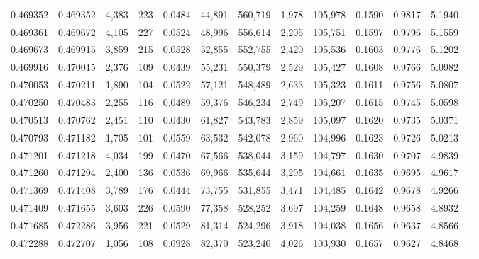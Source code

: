 \begin{tabular}{rrrrrrrrrrrrr}
0.469352 & 0.469352 & 4,383 &   223 &                                     0.0484 &  44,891 & 560,719 &   1,978 & 105,978 & 0.1590 & 0.9817 & 5.1940 \\
0.469361 & 0.469672 & 4,105 &   227 &                                     0.0524 &  48,996 & 556,614 &   2,205 & 105,751 & 0.1597 & 0.9796 & 5.1559 \\
0.469673 & 0.469915 & 3,859 &   215 &                                     0.0528 &  52,855 & 552,755 &   2,420 & 105,536 & 0.1603 & 0.9776 & 5.1202 \\
0.469916 & 0.470015 & 2,376 &   109 &                                     0.0439 &  55,231 & 550,379 &   2,529 & 105,427 & 0.1608 & 0.9766 & 5.0982 \\
0.470053 & 0.470211 & 1,890 &   104 &                                     0.0522 &  57,121 & 548,489 &   2,633 & 105,323 & 0.1611 & 0.9756 & 5.0807 \\
0.470250 & 0.470483 & 2,255 &   116 &                                     0.0489 &  59,376 & 546,234 &   2,749 & 105,207 & 0.1615 & 0.9745 & 5.0598 \\
0.470513 & 0.470762 & 2,451 &   110 &                                     0.0430 &  61,827 & 543,783 &   2,859 & 105,097 & 0.1620 & 0.9735 & 5.0371 \\
0.470793 & 0.471182 & 1,705 &   101 &                                     0.0559 &  63,532 & 542,078 &   2,960 & 104,996 & 0.1623 & 0.9726 & 5.0213 \\
0.471201 & 0.471218 & 4,034 &   199 &                                     0.0470 &  67,566 & 538,044 &   3,159 & 104,797 & 0.1630 & 0.9707 & 4.9839 \\
0.471260 & 0.471294 & 2,400 &   136 &                                     0.0536 &  69,966 & 535,644 &   3,295 & 104,661 & 0.1635 & 0.9695 & 4.9617 \\
0.471369 & 0.471408 & 3,789 &   176 &                                     0.0444 &  73,755 & 531,855 &   3,471 & 104,485 & 0.1642 & 0.9678 & 4.9266 \\
0.471409 & 0.471655 & 3,603 &   226 &                                     0.0590 &  77,358 & 528,252 &   3,697 & 104,259 & 0.1648 & 0.9658 & 4.8932 \\
0.471685 & 0.472286 & 3,956 &   221 &                                     0.0529 &  81,314 & 524,296 &   3,918 & 104,038 & 0.1656 & 0.9637 & 4.8566 \\
0.472288 & 0.472707 & 1,056 &   108 &                                     0.0928 &  82,370 & 523,240 &   4,026 & 103,930 & 0.1657 & 0.9627 & 4.8468 \\

\end{tabular}
